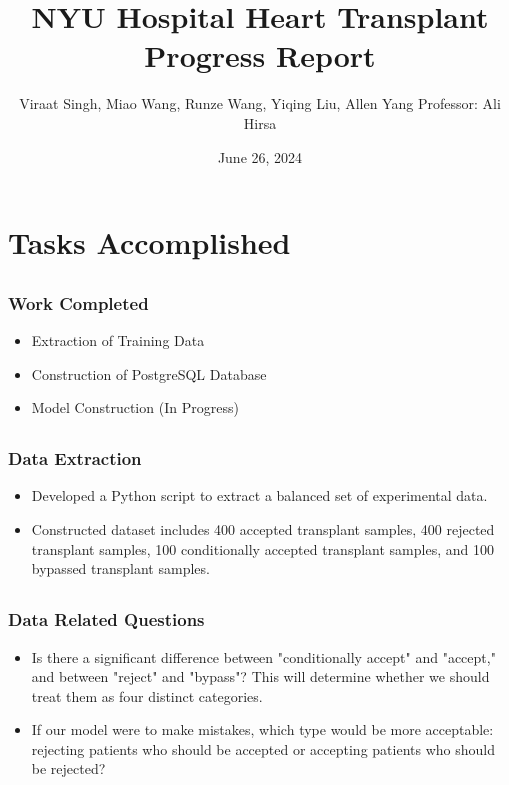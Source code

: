 \documentclass[pdf]{beamer}
\title{NYU Hospital Heart Transplant Progress Report}
\author{{Viraat Singh, Miao Wang, Runze Wang, Yiqing Liu, Allen Yang}\newline
{Professor: Ali Hirsa}
}
\date{June 26, 2024}
\theoremstyle{definition} \theoremstyle{plain} \theoremstyle{remark}
\newcommand{\1}{\mathbf{1} }
\begin{document}
\frame{\titlepage}

\section{Tasks Accomplished}

\subsection{}
\begin{frame}
\frametitle{Work Completed}
\begin{itemize}
    \item Extraction of Training Data
    \vspace{0.12in}
    \item Construction of PostgreSQL Database
    \vspace{0.12in}
    \item Model Construction (In Progress)
    \vspace{0.12in}
\end{itemize}
\end{frame}

\subsection{}
\begin{frame}
\frametitle{Data Extraction}
\begin{itemize}
    \item Developed a Python script to extract a balanced set of experimental data.
    \vspace{0.12in}
    \item Constructed dataset includes 400 accepted transplant samples, 400 rejected transplant samples, 100 conditionally accepted transplant samples, and 100 bypassed transplant samples.
    \vspace{0.12in}
\end{itemize}
\end{frame}

\subsection{}
\begin{frame}
\frametitle{Data Related Questions}
\begin{itemize}
    \item Is there a significant difference between "conditionally accept" and "accept," and between "reject" and "bypass"? This will determine whether we should treat them as four distinct categories.
    \vspace{0.12in}
    \item If our model were to make mistakes, which type would be more acceptable: rejecting patients who should be accepted or accepting patients who should be rejected?
\end{itemize}
\end{frame}
\end{document}

